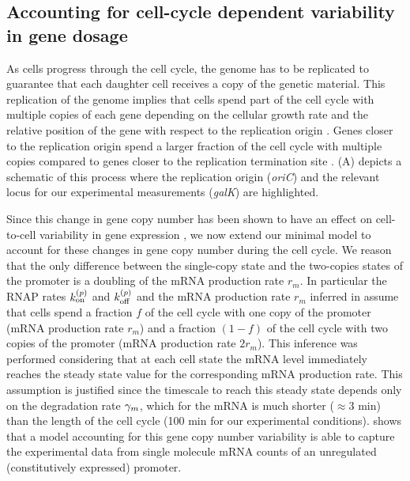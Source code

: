 \subsection{Accounting for cell-cycle dependent variability in gene dosage}
\label{sec_cell_cycle}

As cells progress through the cell cycle, the genome has to be replicated to
guarantee that each daughter cell receives a copy of the genetic material.
This replication of the genome implies that cells spend part of the cell cycle
with multiple copies of each gene depending on the cellular growth rate and the
relative position of the gene with respect to the replication origin
\cite{Bremer1996}. Genes closer to the replication origin spend a larger
fraction of the cell cycle with multiple copies compared to genes closer to the
replication termination site \cite{Bremer1996}. (A)
depicts a schematic of this process where the replication origin ({\it oriC})
and the relevant locus for our experimental measurements ({\it galK}) are
highlighted.

Since this change in gene copy number has been shown to have an effect on
cell-to-cell variability in gene expression \cite{Jones2014a, Peterson2015}, we
now extend our minimal model to account for these changes in gene copy number
during the cell cycle.  We reason that the only difference between the
single-copy state and the two-copies states of the promoter is a doubling of the
mRNA production rate $r_m$. In particular the RNAP rates $k^{(p)}_{\text{on}}$ and $k^{(p)}_{\text{off}}$
and the mRNA production rate $r_m$ inferred in 
assume that cells spend a fraction $f$ of the cell cycle  with one copy of the
promoter (mRNA production rate $r_m$) and a fraction $(1-f)$ of the cell cycle
with two copies of the promoter (mRNA production rate $2 r_m$). This inference
was performed considering that at each cell state the mRNA level immediately
reaches the steady state value for the corresponding mRNA production rate. This
assumption is justified since the timescale to reach this steady
state depends only on the degradation rate $\gamma _m$, which for the mRNA  is much
shorter ($\approx 3$ min) than the length of the cell cycle (100 min for our
experimental conditions).
 shows that a model
accounting for this gene copy number variability is able to capture the
experimental data from single molecule mRNA counts of an unregulated
(constitutively expressed) promoter.

